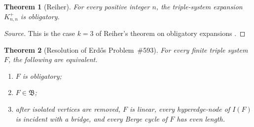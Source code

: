 \documentclass[11pt]{amsart}
\newtheorem{theorem}{Theorem}[section]
\theoremstyle{definition}
\theoremstyle{remark}
\numberwithin{equation}{section}
\newcommand{\Bclass}{\mathfrak B}
\begin{document}
\begin{theorem}[Reiher]
\label{thm:Reiher}
For every positive integer $n$, the triple-system expansion
$K_{n,n}^+$ is obligatory.
\end{theorem}

\begin{proof}[Source]
This is the case $k=3$ of Reiher's theorem on obligatory expansions
\cite[Theorem~1.2]{ReiherObligatory}.
\end{proof}

\begin{theorem}[Resolution of Erd\H{o}s Problem~\#593]
\label{thm:classification}
For every finite triple system $F$, the following are equivalent.
\begin{enumerate}[label=\textup{(\roman*)}]
\item $F$ is obligatory;
\item $F\in\Bclass$;
\item after isolated vertices are removed, $F$ is linear, every
hyperedge-node of $I(F)$ is incident with a bridge, and every Berge cycle
of $F$ has even length.
\end{enumerate}
\end{theorem}
\end{document}
